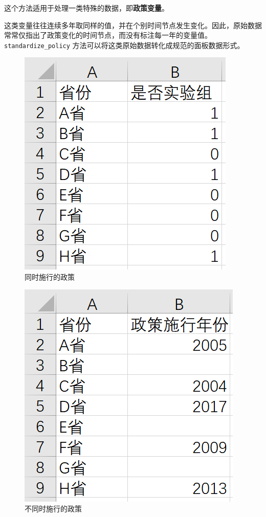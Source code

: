 \documentclass[a4paper, UTF8, fontset=none]{ctexart}
\begin{document}
    这个方法适用于处理一类特殊的数据，即\textbf{政策变量}。
    
    这类变量往往连续多年取同样的值，并在个别时间节点发生变化。因此，原始数据常常仅指出了政策变化的时间节点，而没有标注每一年的变量值。\verb|standardize_policy| 方法可以将这类原始数据转化成规范的面板数据形式。

    \begin{figure}
        \centering
        \includegraphics[height=0.15\textheight]{pics/002.png}
        \caption{同时施行的政策}
        \label{synchronic}
    \end{figure}

    \begin{figure}
        \centering
        \includegraphics[height=0.15\textheight]{pics/003.png}
        \caption{不同时施行的政策}
        \label{diachronic}
    \end{figure}
\end{document}
